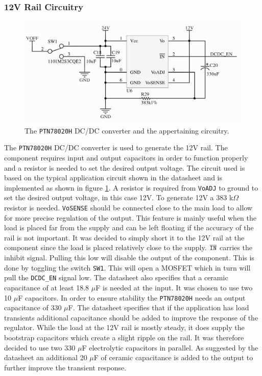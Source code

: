 

\subsubsection{12V Rail Circuitry}

\begin{figure}
	\centering
	\includegraphics[width=\linewidth]{graphics/dcdc12v}
	\caption[PTN78020H DC/DC converter circuitry.]{The \texttt{PTN78020H} DC/DC converter and the appertaining circuitry.}
	\label{fig:dcdc12v}
\end{figure}

The \texttt{PTN78020H} DC/DC converter is used to generate the 12V rail. 
The component requires input and output capacitors in order to function properly and a resistor is needed to set the desired output voltage. 
The circuit used is based on the typical application circuit shown in the datasheet \cite{PTN78020H} and is implemented as shown in figure \ref{fig:dcdc12v}.
A resistor is required from \texttt{VoADJ} to ground to set the desired output voltage, in this case 12V.
To generate 12V a 383 k$\Omega$ resistor is needed.
\texttt{VoSENSE} should be connected close to the main load to allow for more precise regulation of the output.
This feature is mainly useful when the load is placed far from the supply and can be left floating if the accuracy of the rail is not important.
It was decided to simply short it to the 12V rail at the component since the load is placed relatively close to the supply.
$\overline{\text{\texttt{IN}}}$ carries the inhibit signal.
Pulling this low will disable the output of the component.
This is done by toggling the switch \texttt{SW1}. 
This will open a MOSFET which in turn will pull the \texttt{DCDC\_EN} signal low.
The datasheet also specifies that a ceramic capacitance of at least 18.8 $\mu$F is needed at the input. 
It was chosen to use two 10 $\mu$F capacitors.
In order to ensure stability the \texttt{PTN78020H} needs an output capacitance of 330 $\mu$F.
The datasheet specifies that if the application has load transients additional capacitance should be added to improve the response of the regulator.
While the load at the 12V rail is mostly steady, it does supply the bootstrap capacitors which create a slight ripple on the rail.
It was therefore decided to use two 330 $\mu$F electrolytic capacitors in parallel.
As suggested by the datasheet an additional 20 $\mu$F of ceramic capacitance is added to the output to further improve the transient response.\\

